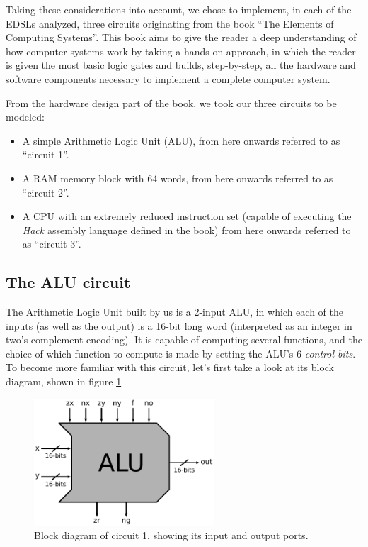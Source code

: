 \documentclass[a4paper]{article}
\begin{document}
        Taking these considerations into account, we chose to implement, in each of the EDSLs
        analyzed, three circuits originating from the book ``The Elements of Computing
        Systems''\cite{nand2tetris-book}. This book aims to give the reader a deep understanding of
        how computer systems work by taking a hands-on approach, in which the reader is given the
        most basic logic gates and builds, step-by-step, all the hardware and software components
        necessary to implement a complete computer system.

        \newpage

        From the hardware design part of the book, we took our three circuits to be modeled:
        \begin{itemize}
            \item A simple Arithmetic Logic Unit (ALU), from here onwards referred to
                as ``circuit 1''.
            \item A RAM memory block with 64 words, from here onwards referred to as ``circuit 2''.
            \item A CPU with an extremely reduced instruction set (capable of executing the
                \emph{Hack} assembly language defined in the book) from here onwards referred to as
                ``circuit 3''.
        \end{itemize}

        \subsection{The ALU circuit}
        \label{subsec:circuit-alu}
            The Arithmetic Logic Unit built by us is a 2-input ALU, in which each of the inputs (as
            well as the output) is a 16-bit long word (interpreted as an integer in two's-complement
            encoding). It is capable of computing several functions, and the choice of which
            function to compute is made by setting the ALU's 6 \emph{control bits}. To become more
            familiar with this circuit, let's first take a look at its block diagram, shown in
            figure \ref{fig:alu-block}
            \begin{figure}[h]
                \begin{center}
                    \includegraphics[width=0.6\textwidth]{imgs/alu-block.pdf}
                \end{center}
                \label{fig:alu-block}
                \caption{Block diagram of circuit 1, showing its input and output ports.}
            \end{figure}
\end{document}
